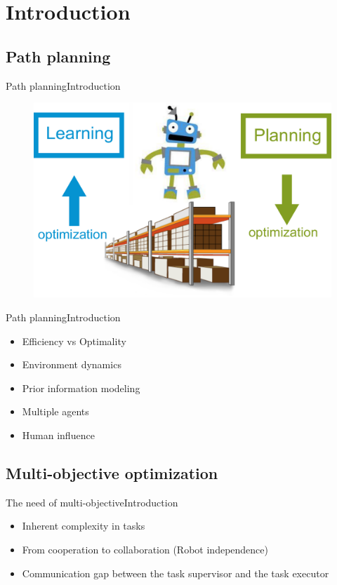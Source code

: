 \section{Introduction}

\subsection{Path planning}

\begin{frame}{Path planning}{Introduction}
	\begin{figure}
		\centering
		\includegraphics[width=.7\linewidth]{figure/robot_interaction}
		\label{fig:robot}
	\end{figure}
 \end{frame}

\begin{frame}{Path planning}{Introduction}
\begin{itemize}
\item Efficiency vs Optimality
\item Environment dynamics
\item Prior information modeling
\item Multiple agents
\item Human influence
\end{itemize}
\end{frame}

\subsection{Multi-objective optimization}

\begin{frame}{The need of multi-objective}{Introduction}
\begin{itemize}
\item Inherent complexity in tasks
\item From cooperation to collaboration (Robot independence)
\item Communication gap between the task supervisor and the task executor
\end{itemize}
\end{frame}

